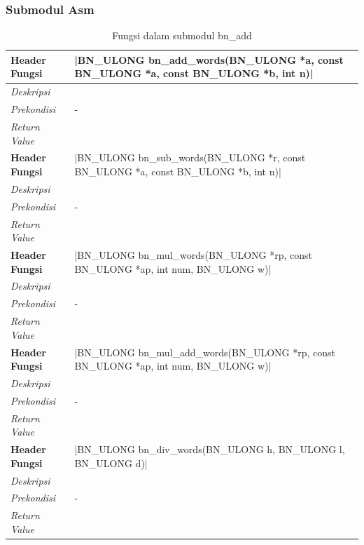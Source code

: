 \subsubsection{Submodul Asm}
\begin{table}[h]
  \caption{Fungsi dalam submodul bn\_add}
  \begin{tabular}{R{2.5cm}L{10.5cm}}
    \toprule
    \textbf{Header Fungsi} & |BN_ULONG bn_add_words(BN_ULONG *a, const BN_ULONG *a, const BN_ULONG *b, int n)|  \\ \midrule
    \textit{Deskripsi}     &                                                                                    \\
    \textit{Prekondisi}    & -                                                                                  \\
    \textit{Return Value}  &
    \\ \bottomrule
    \textbf{Header Fungsi} & |BN_ULONG bn_sub_words(BN_ULONG *r, const BN_ULONG *a, const BN_ULONG *b, int n)|  \\ \midrule
    \textit{Deskripsi}     &                                                                                    \\
    \textit{Prekondisi}    & -                                                                                  \\
    \textit{Return Value}  &
    \\ \bottomrule
    \textbf{Header Fungsi} & |BN_ULONG bn_mul_words(BN_ULONG *rp, const BN_ULONG *ap, int num, BN_ULONG w)|     \\ \midrule
    \textit{Deskripsi}     &                                                                                    \\
    \textit{Prekondisi}    & -                                                                                  \\
    \textit{Return Value}  &
    \\ \bottomrule
    \textbf{Header Fungsi} & |BN_ULONG bn_mul_add_words(BN_ULONG *rp, const BN_ULONG *ap, int num, BN_ULONG w)| \\ \midrule
    \textit{Deskripsi}     &                                                                                    \\
    \textit{Prekondisi}    & -                                                                                  \\
    \textit{Return Value}  &
    \\ \bottomrule
    \textbf{Header Fungsi} & |BN_ULONG bn_div_words(BN_ULONG h, BN_ULONG l, BN_ULONG d)|                        \\ \midrule
    \textit{Deskripsi}     &                                                                                    \\
    \textit{Prekondisi}    & -                                                                                  \\
    \textit{Return Value}  &
    \\ \bottomrule
  \end{tabular}

\end{table}
